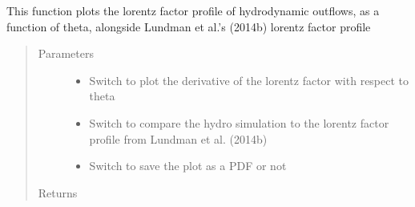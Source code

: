 \documentclass[letterpaper,10pt,english]{sphinxmanual}
\begin{document}

\begin{fulllineitems}
\label{\detokenize{read_process_files:read_process_files.plotfluidGammaVsTheta}}
This function plots the lorentz factor profile of hydrodynamic outflows, as a function of theta, alongside
Lundman et al.’s (2014b) lorentz factor profile
\begin{quote}\begin{description}
\item[{Parameters}] \leavevmode\begin{itemize}
\item {} 
 \textendash{} Switch to plot the derivative of the lorentz factor with respect to theta

\item {} 
 \textendash{} Switch to compare the hydro simulation to the lorentz factor profile from Lundman et al. (2014b)

\item {} 
 \textendash{} Switch to save the plot as a PDF or not

\end{itemize}

\item[{Returns}] \leavevmode


\end{description}\end{quote}

\end{fulllineitems}

\end{document}

